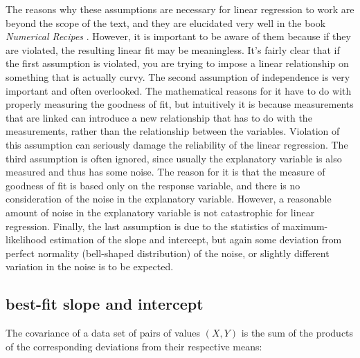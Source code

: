 \documentclass[
  letterpaper,
  DIV=11,
  numbers=noendperiod]{scrreprt}
\begin{document}
The reasons why these assumptions are necessary for linear regression to
work are beyond the scope of the text, and they are elucidated very well
in the book \emph{Numerical Recipes} \cite{press_numerical_2007}.
However, it is important to be aware of them because if they are
violated, the resulting linear fit may be meaningless. It's fairly clear
that if the first assumption is violated, you are trying to impose a
linear relationship on something that is actually curvy. The second
assumption of independence is very important and often overlooked. The
mathematical reasons for it have to do with properly measuring the
goodness of fit, but intuitively it is because measurements that are
linked can introduce a new relationship that has to do with the
measurements, rather than the relationship between the variables.
Violation of this assumption can seriously damage the reliability of the
linear regression. The third assumption is often ignored, since usually
the explanatory variable is also measured and thus has some noise. The
reason for it is that the measure of goodness of fit is based only on
the response variable, and there is no consideration of the noise in the
explanatory variable. However, a reasonable amount of noise in the
explanatory variable is not catastrophic for linear regression. Finally,
the last assumption is due to the statistics of maximum-likelihood
estimation of the slope and intercept, but again some deviation from
perfect normality (bell-shaped distribution) of the noise, or slightly
different variation in the noise is to be expected.

\hypertarget{best-fit-slope-and-intercept}{%
\subsection{best-fit slope and
intercept}\label{best-fit-slope-and-intercept}}

\begin{tcolorbox}[enhanced jigsaw, arc=.35mm, colframe=quarto-callout-note-color-frame, left=2mm, opacitybacktitle=0.6, breakable, title=\textcolor{quarto-callout-note-color}{\faInfo}\hspace{0.5em}{Definition}, toprule=.15mm, coltitle=black, bottomtitle=1mm, toptitle=1mm, colback=white, leftrule=.75mm, colbacktitle=quarto-callout-note-color!10!white, titlerule=0mm, opacityback=0, rightrule=.15mm, bottomrule=.15mm]

The  covariance of a data set of pairs of values
\((X,Y)\) is the sum of the products of the corresponding deviations
from their respective means:

\end{tcolorbox}
\end{document}
